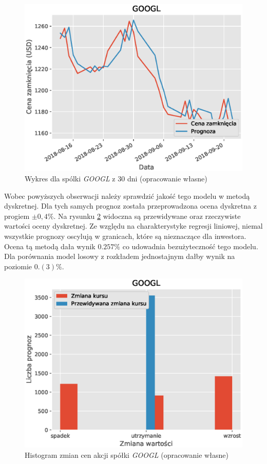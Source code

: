 \documentclass[a4paper, twoside, 11pt, openright]{article}
\begin{document}
\begin{figure}[H]
\centering \includegraphics[scale=0.9]{img/linear_regression/l_r_1_day_last_30}
\caption{Wykres dla spólki \textit{GOOGL} z 30 dni (opracowanie własne)}
\label{l_r_1_day_last_30}
\end{figure}


\bigskip

Wobec powyższych obserwacji należy sprawdzić jakość tego modelu w metodą dyskretnej. Dla tych samych prognoz została przeprowadzona ocena dyskretna z progiem $\pm0,4\%$. Na rysunku \ref{l_r_discrete_score} widoczna są przewidywane oraz rzeczywiste wartości oceny dyskretnej. Ze względu na charakterystyke regresji liniowej, niemal wszystkie prognozy oscylują w granicach, które są nieznaczące dla inwestora. Ocena tą metodą dała wynik $0.257\%$ co udowadnia bezużyteczność tego modelu. Dla porównania model losowy z rozkładem jednostajnym dałby wynik na poziomie $0.(3)\%$.


\begin{figure}[H]
\centering \includegraphics[scale=0.9]{img/linear_regression/l_r_discrete_score}
\caption{Histogram zmian cen akcji spółki \textit{GOOGL} (opracowanie własne)}
\label{l_r_discrete_score}
\end{figure}
\end{document}
